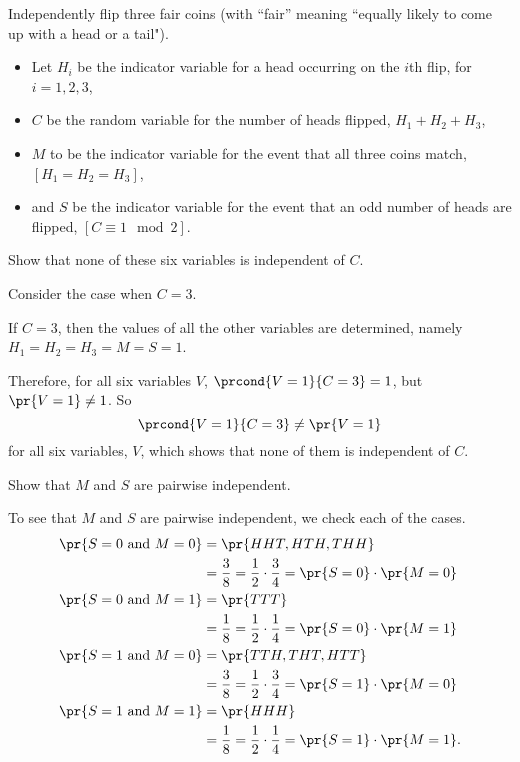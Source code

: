 \documentclass[handout]{mcs}
\begin{document}
\begin{problem}
Independently flip three fair coins (with ``fair'' meaning ``equally likely to come
up with a head or a tail").
\begin{itemize}
\item Let $H_i$ be the indicator variable for a head occurring on the $i$th flip, for $i=1,2,3$,
\item $C$ be the random variable for the number of heads flipped, $H_1+H_2+H_3$,
\item $M$ to be the indicator variable for the event that all three coins match, $[H_1=H_2=H_3]$,
\item and $S$ be the indicator variable for the event that an odd number of heads are flipped, $[C \equiv 1 \mod 2]$.
\end{itemize}

\bparts

\ppart\label{depC} Show that none of these six variables is independent of $C$.

\hint Consider the case when $C=3$.

\begin{solution}
If $C=3$, then the values of all the other variables are determined, namely $H_1=H_2=H_3=M=S=1$.  

Therefore, for all six variables $V$, $\prcond{V=1}{C=3} = 1$, but $\pr{V=1}\neq 1$. So
\[
\prcond{V=1}{C=3} \neq \pr{V=1}
\]
for all six variables, $V$, which shows that none of them is independent of $C$.
\end{solution}

\ppart Show that $M$ and $S$ are pairwise independent.

\begin{solution}
To see that $M$ and $S$ are pairwise independent, we check each of the cases.
\begin{align*}
\pr{S=0 \text{ and } M=0} & = \pr{HHT,HTH,THH}\\
    & = \frac{3}{8} = \frac{1}{2} \cdot \frac{3}{4} =\pr{S=0} \cdot \pr{M = 0}\\
\pr{S=0 \text{ and } M=1} & = \pr{TTT}\\
    & = \frac{1}{8} = \frac{1}{2} \cdot \frac{1}{4} =\pr{S=0} \cdot \pr{M = 1}\\
\pr{S=1 \text{ and } M=0} & = \pr{TTH,THT,HTT}\\
    & = \frac{3}{8} = \frac{1}{2} \cdot \frac{3}{4} =\pr{S = 1} \cdot \pr{M = 0}\\
\pr{S=1 \text{ and } M=1} & = \pr{HHH}\\
    & = \frac{1}{8} = \frac{1}{2} \cdot \frac{1}{4} =\pr{S = 1} \cdot \pr{M = 1}.
\end{align*}
\end{solution}


\end{problem}
\end{document}
